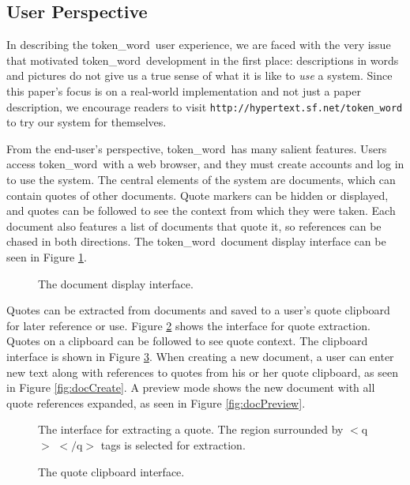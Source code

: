 \documentclass{acm_proc_article-sp}
\newcommand{\tw}{token\_word}
\begin{document}
\subsection{User Perspective}
In describing the \tw \  user experience, we are faced with the very issue that motivated \tw \  development in the first place:  descriptions in words and pictures do not give us a true sense of what it is like to {\it use} a system.
Since this paper's focus is on a real-world implementation and not just a paper description, we encourage readers to visit {\tt http://hypertext.sf.net/token\_word} to try our system for themselves. 

From the end-user's perspective, \tw \  has many sal\-ient features.
Users access \tw \  with a web browser, and they must create accounts and log in to use the system.  
The central elements of the system are documents, which can contain quotes of other documents.
Quote markers can be hidden or displayed, and quotes can be followed to see the context from which they were taken.
Each document also features a list of documents that quote it, so references can be chased in both directions.
The \tw \   document display interface can be seen in Figure \ref{fig:mainScreen}.

\begin{figure}[t]
\centering
{}
\caption{The document display interface.}
\label{fig:mainScreen}
\end{figure}  

Quotes can be extracted from documents and saved to a user's quote clipboard for later reference or use.
Figure \ref{fig:extractQuote} shows the interface for quote extraction. 
Quotes on a clipboard can be followed to see quote context.
The clipboard interface is shown in Figure \ref{fig:quoteClipboard}.
When creating a new document, a user can enter new text along with references to quotes from his or her quote clipboard, as seen in Figure \ref{fig:docCreate}.
A preview mode shows the new document with all quote references expanded, as seen in Figure \ref{fig:docPreview}.

\begin{figure}[t]
\centering
{}
\caption{The interface for extracting a quote.  The region surrounded by $<$q$>$ $<$$/$q$>$ tags is selected for extraction.}
\label{fig:extractQuote}
\end{figure}

\begin{figure}[t]
\centering
{}
\caption{The quote clipboard interface.}
\label{fig:quoteClipboard}
\end{figure}
\end{document}
